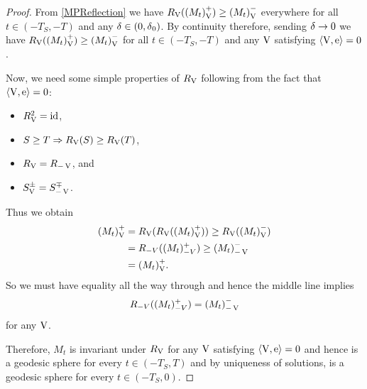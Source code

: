 \documentclass{amsart}
\begin{document}
\begin{proof}
From \cref{MPReflection} we have \(\reflectionmap(\reflectionset{(M_t)}^+) \geq \reflectionset{(M_t)}^-\) everywhere for all \(t \in (-T_S, -T)\) and any \(\reflectionangle \in (0,\reflectionangle_0)\). By continuity therefore, sending \(\reflectionangle \to 0\) we have \(\reflectionmap(\reflectionset{(M_t)}^+) \geq \reflectionset{(M_t)}^-\) for all \(t \in (-T_S, -T)\)  and any \(\reflectionvector\) satisfying \(\ip{\reflectionvector}{\vertvec} = 0\).

Now, we need some simple properties of $\reflectionmap[\reflectionvector]$ following from the fact that $\ip{\reflectionvector}{\vertvec} = 0$:
\begin{itemize}
\item $\reflectionmap^2 = \id$,
\item $S \geq T \Rightarrow \reflectionmap(S) \geq  \reflectionmap(T)$,
\item $\reflectionmap = \reflectionmap[-\reflectionvector]$, and
\item $\reflectionset{S}^{\pm} = \reflectionset[-\reflectionvector]{S}^{\mp}$.
\end{itemize}
Thus we obtain
\begin{align*}
\reflectionset{(M_t)}^+ &= \reflectionmap(\reflectionmap(\reflectionset{(M_t)}^+)) \geq \reflectionmap(\reflectionset{(M_t)}^-) \\
&= R_{-V}((M_t)^+_{-V}) \geq \reflectionset[-\reflectionvector]{(M_t)}^-\\
&= \reflectionset{(M_t)}^+.
\end{align*}
So we must have equality all the way through and hence the middle line implies
\[
R_{-V}((M_t)^+_{-V}) = \reflectionset[-\reflectionvector]{(M_t)}^-
\]
for any $\reflectionvector$.

Therefore, \(M_t\) is invariant under \(\reflectionmap\) for any \(\reflectionvector\) satisfying \(\ip{\reflectionvector}{\vertvec} = 0\) and hence is a geodesic sphere for every \(t \in (-T_S, T)\) and by uniqueness of solutions, is a geodesic sphere for every \(t \in (-T_S, 0)\).
\end{proof}



\end{document}
